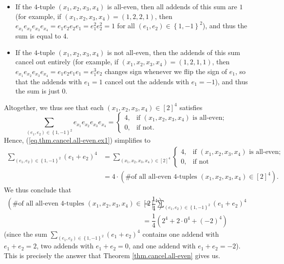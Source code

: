 \begin{itemize}
\item If the $4$-tuple $\left(  x_{1},x_{2},x_{3},x_{4}\right)  $ is all-even,
then all addends of this sum are $1$ (for example, if $\left(  x_{1}%
,x_{2},x_{3},x_{4}\right)  =\left(  1,2,2,1\right)  $, then $e_{x_{1}}%
e_{x_{2}}e_{x_{3}}e_{x_{4}}=e_{1}e_{2}e_{2}e_{1}=e_{1}^{2}e_{2}^{2}=1$ for all
$\left(  e_{1},e_{2}\right)  \in\left\{  1,-1\right\}  ^{2}$), and thus the
sum is equal to $4$.

\item If the $4$-tuple $\left(  x_{1},x_{2},x_{3},x_{4}\right)  $ is not
all-even, then the addends of this sum cancel out entirely (for example, if
$\left(  x_{1},x_{2},x_{3},x_{4}\right)  =\left(  1,2,1,1\right)  $, then
$e_{x_{1}}e_{x_{2}}e_{x_{3}}e_{x_{4}}=e_{1}e_{2}e_{1}e_{1}=e_{1}^{3}e_{2}$
changes sign whenever we flip the sign of $e_{1}$, so that the addends with
$e_{1}=1$ cancel out the addends with $e_{1}=-1$), and thus the sum is just
$0$.
\end{itemize}

Altogether, we thus see that each $\left(  x_{1},x_{2},x_{3},x_{4}\right)
\in\left[  2\right]  ^{4}$ satisfies
\[
\sum_{\left(  e_{1},e_{2}\right)  \in\left\{  1,-1\right\}  ^{2}}e_{x_{1}%
}e_{x_{2}}e_{x_{3}}e_{x_{4}}=%
\begin{cases}
4, & \text{if }\left(  x_{1},x_{2},x_{3},x_{4}\right)  \text{ is all-even};\\
0, & \text{if not.}%
\end{cases}
\]
Hence, (\ref{eq.thm.cancel.all-even.ex1}) simplifies to%
\begin{align*}
\sum_{\left(  e_{1},e_{2}\right)  \in\left\{  1,-1\right\}  ^{2}}\left(
e_{1}+e_{2}\right)  ^{4}  &  =\sum_{\left(  x_{1},x_{2},x_{3},x_{4}\right)
\in\left[  2\right]  ^{4}}%
\begin{cases}
4, & \text{if }\left(  x_{1},x_{2},x_{3},x_{4}\right)  \text{ is all-even};\\
0, & \text{if not}%
\end{cases}
\\
&  =4\cdot\left(  \text{\# of all all-even }4\text{-tuples }\left(
x_{1},x_{2},x_{3},x_{4}\right)  \in\left[  2\right]  ^{4}\right)  .
\end{align*}
We thus conclude that%
\begin{align*}
\left(  \text{\# of all all-even }4\text{-tuples }\left(  x_{1},x_{2}%
,x_{3},x_{4}\right)  \in\left[  2\right]  ^{4}\right)   &  =\dfrac{1}{4}%
\sum_{\left(  e_{1},e_{2}\right)  \in\left\{  1,-1\right\}  ^{2}}\left(
e_{1}+e_{2}\right)  ^{4}\\
&  =\dfrac{1}{4}\left(  2^{4}+2\cdot0^{4}+\left(  -2\right)  ^{4}\right)
\end{align*}
(since the sum $\sum_{\left(  e_{1},e_{2}\right)  \in\left\{  1,-1\right\}
^{2}}\left(  e_{1}+e_{2}\right)  ^{4}$ contains one addend with $e_{1}%
+e_{2}=2$, two addends with $e_{1}+e_{2}=0$, and one addend with $e_{1}%
+e_{2}=-2$). This is precisely the answer that Theorem
\ref{thm.cancel.all-even} gives us.

